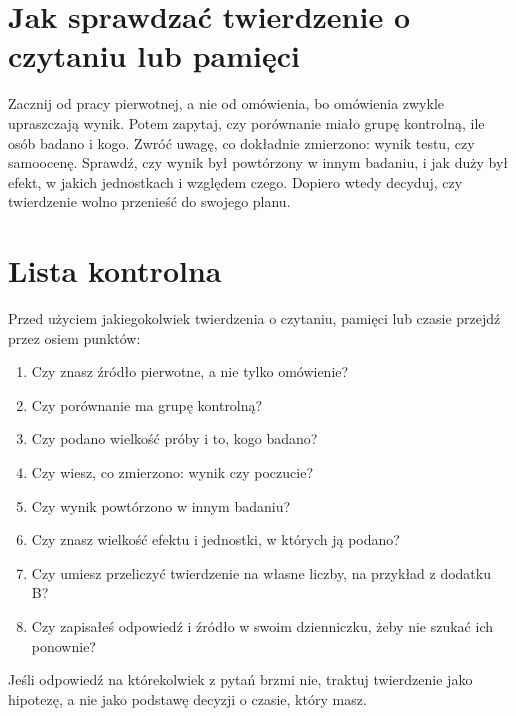 \section{Jak sprawdzać twierdzenie o czytaniu lub pamięci}
Zacznij od pracy pierwotnej, a nie od omówienia, bo omówienia zwykle upraszczają wynik. Potem
zapytaj, czy porównanie miało grupę kontrolną, ile osób badano i kogo. Zwróć uwagę, co dokładnie
zmierzono: wynik testu, czy samoocenę. Sprawdź, czy wynik był powtórzony w innym badaniu, i jak duży
był efekt, w jakich jednostkach i względem czego. Dopiero wtedy decyduj, czy twierdzenie wolno
przenieść do swojego planu.

\section{Lista kontrolna}
Przed użyciem jakiegokolwiek twierdzenia o czytaniu, pamięci lub czasie przejdź przez osiem punktów:
\begin{enumerate}
\item Czy znasz źródło pierwotne, a nie tylko omówienie?
\item Czy porównanie ma grupę kontrolną?
\item Czy podano wielkość próby i to, kogo badano?
\item Czy wiesz, co zmierzono: wynik czy poczucie?
\item Czy wynik powtórzono w innym badaniu?
\item Czy znasz wielkość efektu i jednostki, w których ją podano?
\item Czy umiesz przeliczyć twierdzenie na własne liczby, na przykład z dodatku B?
\item Czy zapisałeś odpowiedź i źródło w swoim dzienniczku, żeby nie szukać ich ponownie?
\end{enumerate}
Jeśli odpowiedź na którekolwiek z pytań brzmi \glqq nie\grqq{}, traktuj twierdzenie jako hipotezę,
a nie jako podstawę decyzji o czasie, który masz.
